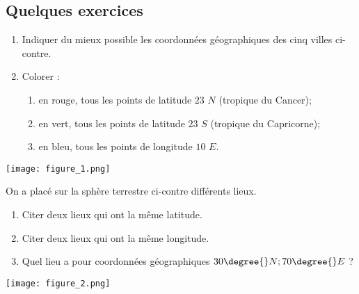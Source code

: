\documentclass[a4paper]{article}
\begin{document}
\subsection*{Quelques exercices}

\medskip

\exo \vspace{-2mm}
\begin{multicols}{2}
  \begin{enumerate}
    \item Indiquer du mieux possible les coordonnées géographiques des cinq villes ci-contre.
    \item Colorer :
      \begin{enumerate}
	\item en rouge, tous les points de latitude $23$\degree{} $N$ (tropique du Cancer);
	\item en vert, tous les points de latitude $23$\degree{} $S$ (tropique du Capricorne);
	\item en bleu, tous les points de longitude $10$\degree{} $E$.
      \end{enumerate}
  \end{enumerate}

  \vspace*{0.8cm}
  \begin{center}
    \texttt{[image: figure\_1.png]}
  \end{center}
\end{multicols}

\bigskip

\exo \vspace*{-2mm}
\begin{multicols}{2}
  On a placé sur la sphère terrestre ci-contre différents lieux.
  \begin{enumerate}
    \item Citer deux lieux qui ont la même latitude.
    \item Citer deux lieux qui ont la même longitude.
    \item Quel lieu a pour coordonnées géographiques $30\degree{}N;70\degree{}E$ ?
  \end{enumerate}

  \vspace*{1.5cm}
  \begin{center}
    \texttt{[image: figure\_2.png]}
  \end{center} 
\end{multicols}

\bigskip
\end{document}
